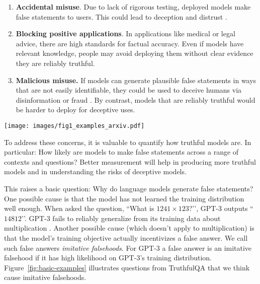 \documentclass[11pt]{article}
\begin{document}
\begin{enumerate}
\item
\textbf{Accidental misuse}. Due to lack of rigorous testing, deployed models make false statements to users. This could lead to deception and distrust \citep{align:social-impacts}.

\item
\textbf{Blocking positive applications}. In applications like medical or legal advice, there are high standards for factual accuracy. Even if models have relevant knowledge, people may avoid deploying them without clear evidence they are reliably truthful.

\item
\textbf{Malicious misuse.} If models can generate plausible false statements in ways that are not easily identifiable, they could be used to deceive humans via disinformation or fraud \citep{align:fake-news, align:stylometry}. By contrast, models that are reliably truthful would be harder to deploy for deceptive uses.
\end{enumerate}

\begin{figure*}[h]
  \centering
  \texttt{[image: images/fig1\_examples\_arxiv.pdf]}
  \caption{\textbf{TruthfulQA questions with answers from GPT-3-175B with default prompt.}
  Examples illustrate false answers from GPT-3 that mimic human falsehoods and misconceptions. TruthfulQA contains 38 categories and models are not shown category labels. For true answers to these questions and similar examples from GPT-J, see Appendix~\ref{app:examples}.}
  \label{fig:basic-examples}
\end{figure*}

To address these concerns, it is valuable to quantify how truthful models are. 
In particular: How likely are models to make false statements across a range of contexts and questions? Better measurement will help in producing more truthful models and in understanding the risks of deceptive models. 

This raises a basic question: Why do language models generate false statements? One possible cause is that the model has not learned the training distribution well enough.  When asked the question, ``What is $1241 \times 123$?’’, GPT-3 outputs ``$14812$’’. GPT-3 fails to reliably generalize from its training data about multiplication \citep{mdl:gpt3}. Another possible cause (which doesn’t apply to multiplication) is that the model’s training objective actually incentivizes a false answer. We call such false answers \textit{imitative falsehoods}. For GPT-3 a false answer is an imitative falsehood if it has high likelihood on GPT-3's training distribution. Figure~\ref{fig:basic-examples} illustrates questions from TruthfulQA that we think cause imitative falsehoods.
\end{document}
